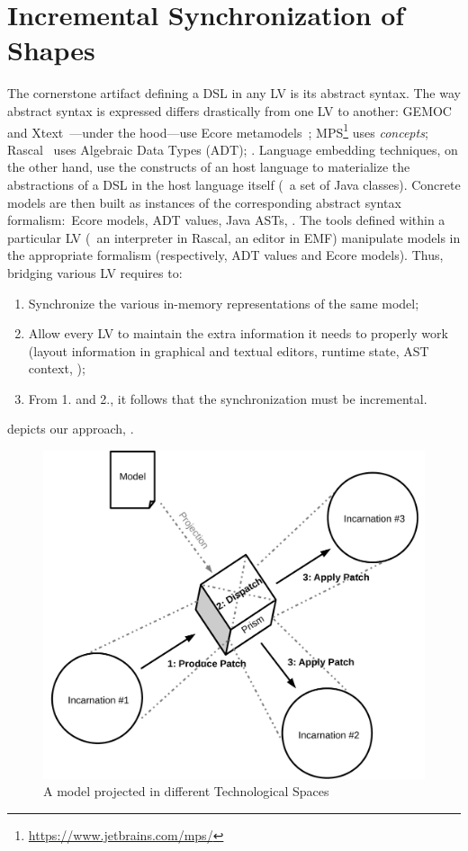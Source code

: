\section{Incremental Synchronization of Shapes}

The cornerstone artifact defining a DSL in any LV is its abstract syntax.
The way abstract syntax is expressed differs drastically from one LV to another: GEMOC~\cite{bousse2016execution} and Xtext~\cite{bettini2016implementing}---under the hood---use Ecore metamodels~\cite{steinberg2008emf}; MPS\footnote{\url{https://www.jetbrains.com/mps/}} uses \emph{concepts}; Rascal~\cite{klint2010easy} uses Algebraic Data Types (ADT); \etc.
Language embedding techniques, on the other hand, use the constructs of an host language to materialize the abstractions of a DSL in the host language itself (\eg~a set of Java classes).
Concrete models are then built as instances of the corresponding abstract syntax formalism:~Ecore models, ADT values, Java ASTs, \etc.
The tools defined within a particular LV (\eg~an interpreter in Rascal, an editor in EMF) manipulate models in the appropriate formalism (respectively, ADT values and Ecore models).
Thus, bridging various LV requires to:
\begin{enumerate}
	\item Synchronize the various in-memory representations of the same model;
	\item Allow every LV to maintain the extra information it needs to properly work (layout information in graphical and textual editors, runtime state, AST context, \etc);
	\item From 1. and 2., it follows that the synchronization must be incremental.
\end{enumerate}

 depicts our approach, \prism.

\begin{figure}
	\centering
	\includegraphics[width=.6\columnwidth]{figures/prism}
	\caption{A model projected in different Technological Spaces}
	\label{fig:prism}
\end{figure}


